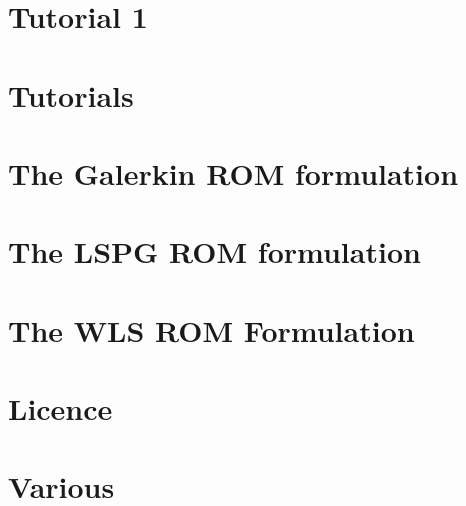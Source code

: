 \documentclass[twoside]{book}
\newcommand{\+}{\discretionary{\mbox{\scriptsize$\hookleftarrow$}}{}{}}
\newcommand{\clearemptydoublepage}{%
  \newpage{\pagestyle{empty}\cleardoublepage}%
}
\begin{document}
\chapter{Tutorial 1}
\label{autotoc_md29}

\chapter{Tutorials}
\label{autotoc_md30}

\chapter{The Galerkin R\+OM formulation}
\label{autotoc_md31}

\chapter{The L\+S\+PG R\+OM formulation}
\label{autotoc_md32}

\chapter{The W\+LS R\+OM Formulation}
\label{autotoc_md33}

\chapter{Licence}
\label{autotoc_md34}

\chapter{Various}
\label{autotoc_md35}


\backmatter
\newpage
{}
\clearemptydoublepage
{}
\printindex
\end{document}
